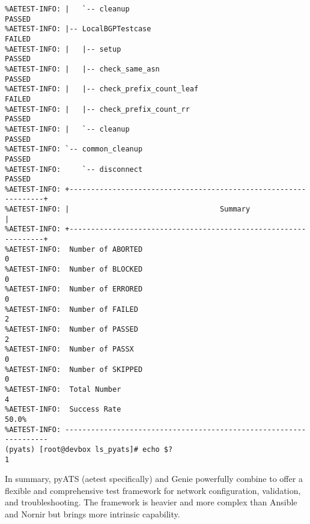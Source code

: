 \begin{verbatim}
%AETEST-INFO: |   `-- cleanup                                             PASSED
%AETEST-INFO: |-- LocalBGPTestcase                                        FAILED
%AETEST-INFO: |   |-- setup                                               PASSED
%AETEST-INFO: |   |-- check_same_asn                                      PASSED
%AETEST-INFO: |   |-- check_prefix_count_leaf                             FAILED
%AETEST-INFO: |   |-- check_prefix_count_rr                               PASSED
%AETEST-INFO: |   `-- cleanup                                             PASSED
%AETEST-INFO: `-- common_cleanup                                          PASSED
%AETEST-INFO:     `-- disconnect                                          PASSED
%AETEST-INFO: +----------------------------------------------------------------+
%AETEST-INFO: |                                   Summary                      |
%AETEST-INFO: +----------------------------------------------------------------+
%AETEST-INFO:  Number of ABORTED                                              0
%AETEST-INFO:  Number of BLOCKED                                              0
%AETEST-INFO:  Number of ERRORED                                              0
%AETEST-INFO:  Number of FAILED                                               2
%AETEST-INFO:  Number of PASSED                                               2
%AETEST-INFO:  Number of PASSX                                                0
%AETEST-INFO:  Number of SKIPPED                                              0
%AETEST-INFO:  Total Number                                                   4
%AETEST-INFO:  Success Rate                                               50.0%
%AETEST-INFO: ------------------------------------------------------------------
(pyats) [root@devbox ls_pyats]# echo $?
1
\end{verbatim}

In summary, pyATS (aetest specifically) and Genie powerfully combine to offer a
flexible and comprehensive test framework for network configuration, validation,
and troubleshooting. The framework is heavier and more complex than Ansible and
Nornir but brings more intrinsic capability.
